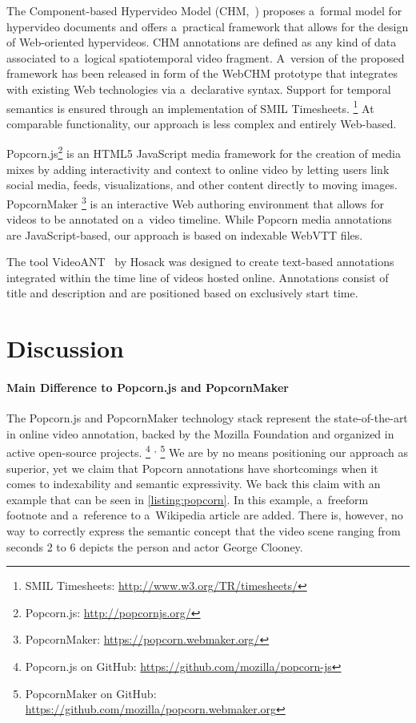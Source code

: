 \documentclass{sig-alternate}
\newcommand{\inlinelistingsize}{\fontsize{8pt}{11pt}}
\let\oldurl\url
\renewcommand{\url}[1]{\inlinelistingsize\oldurl{#1}}
\begin{document}
The Component-based Hypervideo Model
(CHM,~\cite{sadallah2012hypervideo})
proposes a~formal model for hypervideo documents
and offers a~practical framework that allows for
the design of Web-oriented hypervideos.
CHM annotations are defined as any kind of data associated to
a~logical spatiotemporal video fragment.
A~version of the proposed framework
has been released in form of the WebCHM prototype
that integrates with existing Web technologies
via a~declarative syntax.
Support for temporal semantics is ensured through
an implementation of SMIL Timesheets.%
\footnote{SMIL Timesheets:
\url{http://www.w3.org/TR/timesheets/}}
At comparable functionality, our approach is less complex
and entirely Web-based.

Popcorn.js\footnote{Popcorn.js: \url{http://popcornjs.org/}}
is an HTML5 JavaScript media framework
for the creation of media mixes
by adding interactivity and context to online video
by letting users link social media, feeds,
visualizations, and other content directly to moving images.
PopcornMaker%
\footnote{PopcornMaker: \url{https://popcorn.webmaker.org/}}
is an interactive Web authoring environment
that allows for videos to be annotated on a~video timeline.
While Popcorn media annotations are JavaScript-based,
our approach is based on indexable WebVTT files.

The tool VideoANT~\cite{hosack2010videoant} by Hosack
was designed to create text-based annotations
integrated within the time line of videos hosted online.
Annotations consist of title and description and
are positioned based on exclusively start time.

\section{Discussion}

\paragraph{Main Difference to Popcorn.js and PopcornMaker}

The Popcorn.js and PopcornMaker technology stack
represent the state-of-the-art in online video annotation,
backed by the Mozilla Foundation
and organized in active open-source projects.%
\footnote{Popcorn.js on GitHub: \url{https://github.com/mozilla/popcorn-js}}%
\textsuperscript{,}%
\footnote{PopcornMaker on GitHub: \url{https://github.com/mozilla/popcorn.webmaker.org}}
We are by no means positioning our approach as superior,
yet we claim that Popcorn annotations have shortcomings
when it comes to indexability and semantic expressivity. 
We back this claim with an example
that can be seen in \autoref{listing:popcorn}.
In this example, a~freeform footnote 
and a~reference to a~Wikipedia article are added.
There is, however, no way to correctly express the semantic concept
that the video scene ranging from seconds 2 to 6 depicts
the person and actor George Clooney.
\end{document}
